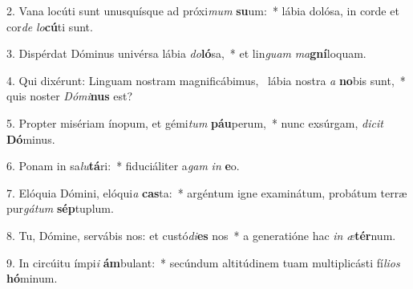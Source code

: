 2. Vana locúti sunt unusquísque ad próxi\textit{mum} \textbf{su}um:~*  lábia dolósa, in corde et cor\textit{de} \textit{lo}\textbf{cú}ti sunt.\

3. Dispérdat Dóminus univérsa lábia \textit{do}\textbf{ló}sa,~*  et lin\textit{guam} \textit{ma}\textbf{gní}loquam.\

4. Qui dixérunt: Linguam nostram magnificábimus, \dag\  lábia nostra \textit{a} \textbf{no}bis sunt,~*  quis noster \textit{Dó}\textit{mi}\textbf{nus} est?\

5. Propter misériam ínopum, et gémi\textit{tum} \textbf{páu}perum,~*  nunc exsúrgam, \textit{di}\textit{cit} \textbf{Dó}minus.\

6. Ponam in sa\textit{lu}\textbf{tá}ri:~*  fiduciáliter a\textit{gam} \textit{in} \textbf{e}o.\

7. Elóquia Dómini, elóqui\textit{a} \textbf{cas}ta:~*  argéntum igne examinátum, probátum terræ pur\textit{gá}\textit{tum} \textbf{sép}tuplum.\

8. Tu, Dómine, servábis nos: et custó\textit{di}\textbf{es} nos~*  a generatióne hac \textit{in} \textit{æ}\textbf{tér}num.\

9. In circúitu ímpi\textit{i} \textbf{ám}bulant:~*  secúndum altitúdinem tuam multiplicásti fí\textit{li}\textit{os} \textbf{hó}minum.\

